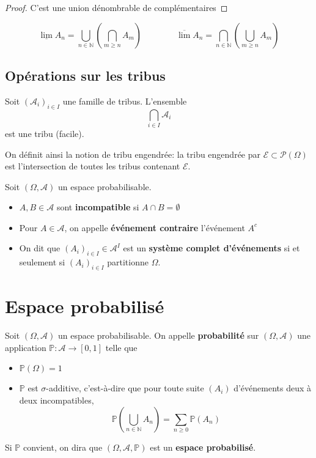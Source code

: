 \begin{proof}
    C'est une union dénombrable de complémentaires
\end{proof}

\begin{notation}[HP]
    \[
        \underline{\lim}A_n=\bigcup_{n\in\mathbb N} \left( \bigcap_{m\geq n} A_m \right) \qquad \qquad \overline{\lim} A_n=\bigcap_{n\in\mathbb N} \left( \bigcup_{m\geq n}A_m \right) 
    \]
\end{notation}

\subsection{Opérations sur les tribus}

Soit $(\mathcal A_i)_{i\in I}$ une famille de tribus. L'ensemble \[
    \bigcap_{i\in I}\mathcal A_i
\]
est une tribu (facile).

\begin{rem}
    On définit ainsi la notion de tribu engendrée: la tribu engendrée par $\mathcal E\subset \mathcal P(\Omega)$ est l'intersection de toutes les tribus contenant $\mathcal E$.
\end{rem}

\begin{dfn}
    Soit $(\Omega, \mathcal A)$ un espace probabilisable. \begin{itemize}
        \item $A,B\in \mathcal A$ sont \textbf{incompatible} si $A \cap B=\emptyset$
        \item Pour $A\in \mathcal A$, on appelle  \textbf{événement contraire} l'événement $A^c$
        \item On dit que $(A_i)_{i\in I} \in  \mathcal A^I$ est un \textbf{système complet d'événements} si et seulement si $(A_i)_{i\in I}$ partitionne $\Omega$.
    \end{itemize}
\end{dfn}

\section{Espace probabilisé}

\begin{dfn}
    Soit $(\Omega, \mathcal A)$ un espace probabilisable. On appelle \textbf{probabilité} sur $(\Omega, \mathcal A)$ une application $\mathbb P:\mathcal A \to  [0, 1]$ telle que \begin{itemize}
        \item $\mathbb P(\Omega)=1$
        \item $\mathbb P$ est $\sigma$-additive, c'est-à-dire que pour toute suite $(A_i)$ d'événements deux à deux incompatibles, \[
                \mathbb P \left( \bigcup_{n\in\mathbb N}A_n \right) =\sum_{n\geq 0}\mathbb P(A_n)
        \]
    \end{itemize}
    Si $\mathbb P$ convient, on dira que $(\Omega, \mathcal A, \mathbb P)$ est un \textbf{espace probabilisé}.
\end{dfn}

